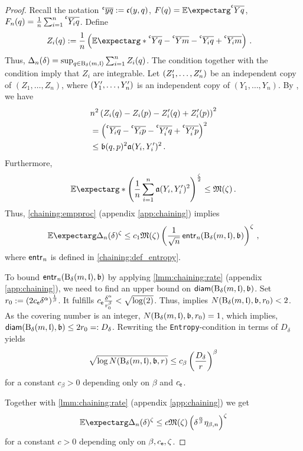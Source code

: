 \begin{proof}
	Recall the notation $\olc yq := \mf c(y,q)$, $F(q) = \Ex{\olc Yq}$,  $F_n(q) = \frac1n \sum_{i=1}^n \olc {Y_i}q$.
	Define
	\begin{align*}
		Z_i(q) 
		&:= 
		\frac1n \br{\Ex*{\olc Yq-\olc Ym}- \olc{Y_i}q+\olc{Y_i}m}
		\eqfs
	\end{align*}
	Thus, $\Delta_n(\delta) = \sup_{q\in\operatorname{\mathrm{B}}_\delta(m, \mathfrak{l})}\sum_{i=1}^n Z_i(q)$.
	The  condition together with the  condition imply that $Z_i$ are integrable.
	Let $(Z_1^\prime, \dots, Z_n^\prime)$ be an independent copy of $(Z_1, \dots, Z_n)$, where $(Y_1^\prime, \dots, Y_n^\prime)$ is an independent copy of $(Y_1, \dots, Y_n)$.
	By , we have
	\begin{align*}
		&
		n^2\br{Z_i(q)-Z_i(p)-Z_i\pr(q) +Z_i\pr(p)}^2 
		\\&= 
		\br{\olc{Y_i}q-\olc{Y_i}p-\olc{Y_i\pr}q+\olc{Y_i\pr}p}^2
		\\&\leq 
		\mf b(q,p)^2 \mf a(Y_i,Y_i\pr)^2
		\eqfs
	\end{align*}
	Furthermore,
	\begin{equation*}
		\Ex*{\br{\frac1n\sum_{i=1}^n \mf a(Y_i,Y_i\pr)^2}^{\frac\zeta2}} \leq \mf M(\zeta)
		\eqfs
	\end{equation*}
	Thus, \autoref{chaining:empproc} (appendix \autoref{app:chaining}) implies
	\begin{equation*}
		\Ex{\Delta_n(\delta)^\zeta} \leq c_1 \mf M(\zeta) \br{\frac1{\sqrt{n}} \entrn(\ball_\delta(m, \mf l), \mf b)}^\zeta\eqcm
	\end{equation*}
	where $\operatorname{\mathsf{entr}_\mathit{n}}$ is defined in \autoref{chaining:def_entropy}.
	
	To bound $\operatorname{\mathsf{entr}_\mathit{n}}(\operatorname{\mathrm{B}}_\delta(m, \mathfrak{l}), \mathfrak{b})$ by applying \autoref{lmm:chaining:rate} (appendix \autoref{app:chaining}), we need to find an upper bound on $\operatorname{\mathsf{diam}}(\operatorname{\mathrm{B}}_\delta(m, \mathfrak{l}), \mathfrak{b})$.
	Set $r_0 := (2 c_{\mathsf{e}} \delta^\alpha)^{\frac1\beta}$.
	It fulfills $c_{\mathsf{e}} \frac{\delta^\alpha}{r_0^\beta} < \sqrt{\log(2)}$. Thus,  implies $N(\operatorname{\mathrm{B}}_\delta(m, \mathfrak{l}), \mathfrak{b}, r_0) < 2$.
	As the covering number is an integer, $N(\operatorname{\mathrm{B}}_\delta(m, \mathfrak{l}), \mathfrak{b}, r_0) = 1$, which implies, $\operatorname{\mathsf{diam}}(\operatorname{\mathrm{B}}_\delta(m, \mathfrak{l}), \mathfrak{b}) \leq 2r_0 =: D_\delta$.
	Rewriting the  \texttt{Entropy}-condition in terms of $D_\delta$ yields
	\begin{equation*}
	\sqrt{\log N(\operatorname{\mathrm{B}}_\delta(m, \mathfrak{l}), \mathfrak{b}, r)} \leq c_\beta \left( \frac{D_\delta}{r} \right)^\beta
	\end{equation*}
	for a constant $c_\beta > 0$ depending only on $\beta$ and $c_{\mathsf{e}}$.
	
	Together with \autoref{lmm:chaining:rate} (appendix \autoref{app:chaining}) we get
	\begin{equation*}
		\Ex{\Delta_n(\delta)^\zeta} \leq c \mf M(\zeta) \br{\delta^{\frac\alpha\beta} \eta_{\beta,n}}^\zeta
	\end{equation*}
	for a constant $c > 0$ depending only on $\beta, c_{\mathsf{e}}, \zeta$.
\end{proof}
